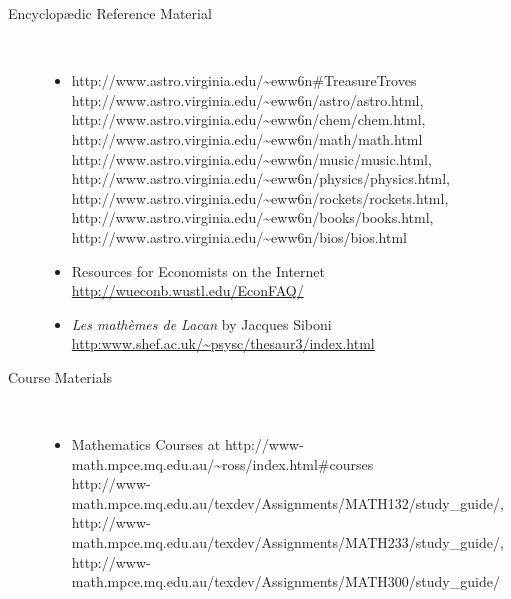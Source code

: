 \begin{description}
\begin{itemize}
%

\end{itemize}


\htmlrule[50\% center]

\item[Encyclop\ae{}dic Reference Material]~%
\begin{itemize}
\item
{}%
{http://www.astro.virginia.edu/\~{}eww6n\#TreasureTroves}
%
{http://www.astro.virginia.edu/\~{}eww6n/astro/astro.html},
%
{http://www.astro.virginia.edu/\~{}eww6n/chem/chem.html},
%
{http://www.astro.virginia.edu/\~{}eww6n/math/math.html}\\
%
{http://www.astro.virginia.edu/\~{}eww6n/music/music.html},
%
{http://www.astro.virginia.edu/\~{}eww6n/physics/physics.html},
%
{http://www.astro.virginia.edu/\~{}eww6n/rockets/rockets.html},
%
{http://www.astro.virginia.edu/\~{}eww6n/books/books.html},
%
{http://www.astro.virginia.edu/\~{}eww6n/bios/bios.html}
\html{\smallskip}

\item
Resources for Economists on the Internet\\
\url{http://wueconb.wustl.edu/EconFAQ/}
\html{\smallskip}

\item
\textit{Les math\`emes de Lacan} by Jacques Siboni\\
\url{http:www.shef.ac.uk/~psysc/thesaur3/index.html}
\html{\smallskip}

\end{itemize}

\htmlrule[50\% center]


\item[Course Materials]~%
\begin{itemize}
\item
Mathematics Courses at %
{http://www-math.mpce.mq.edu.au/\~{}ross/index.html\#courses}\\
%
{http://www-math.mpce.mq.edu.au/texdev/Assignments/MATH132/study_guide/},
%
{http://www-math.mpce.mq.edu.au/texdev/Assignments/MATH233/study_guide/},
%
{http://www-math.mpce.mq.edu.au/texdev/Assignments/MATH300/study_guide/}
\html{\smallskip}


\end{itemize}
\end{description}
